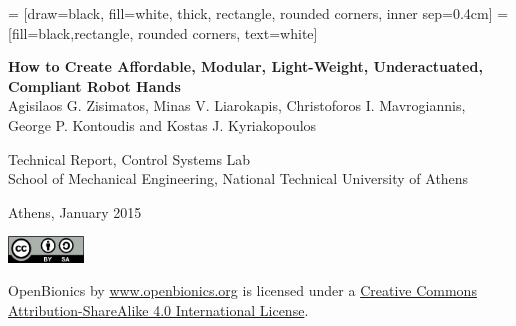 \documentclass[a4paper]{report}
\begin{document}
	 = [draw=black, fill=white, thick, rectangle, rounded corners, inner sep=0.4cm]
	 =[fill=black,rectangle, rounded corners, text=white]

	\begin{titlepage}
	\begin{center}
		{ \Large \bfseries How to Create Affordable, Modular, Light-Weight, Underactuated, Compliant Robot Hands\\[0.5cm] }
                { \large Agisilaos G. Zisimatos, Minas V. Liarokapis, Christoforos I. Mavrogiannis,\\ George P. Kontoudis and Kostas J. Kyriakopoulos}

                \vspace{1.4in}


                \vspace{2in}

		{ \large Technical Report, Control Systems Lab\\
                   School of Mechanical Engineering, National Technical University of Athens \\[0.5cm] }

		{ \large Athens, January 2015 \\[0.5cm] }
		
		
	\end{center}
	\end{titlepage}

	\newpage


	\begin{minipage}{0.2\textwidth}
		\includegraphics[width=2cm]{figures/License.png}
	\end{minipage}
	\begin{minipage}{0.8\textwidth}
		\begin{flushleft} \large        
			OpenBionics by \url{www.openbionics.org} is licensed under a  \href{https://creativecommons.org/licenses/by-sa/4.0/}{Creative Commons Attribution-ShareAlike 4.0 International License}.
		\end{flushleft}
	\end{minipage}
\end{document}
